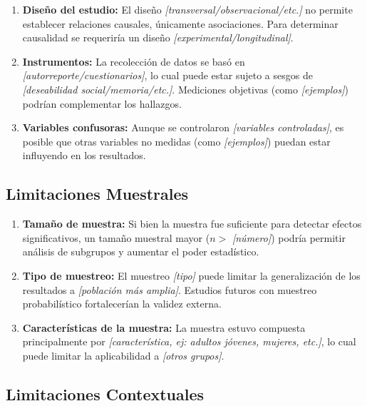 \begin{enumerate}
    \item \textbf{Diseño del estudio:} El diseño \textit{{[transversal/observacional/etc.]}} no permite establecer relaciones causales, únicamente asociaciones. Para determinar causalidad se requeriría un diseño \textit{{[experimental/longitudinal]}}.
    
    \item \textbf{Instrumentos:} La recolección de datos se basó en \textit{{[autorreporte/cuestionarios]}}, lo cual puede estar sujeto a sesgos de \textit{{[deseabilidad social/memoria/etc.]}}. Mediciones objetivas (como \textit{{[ejemplos]}}) podrían complementar los hallazgos.
    
    \item \textbf{Variables confusoras:} Aunque se controlaron \textit{{[variables controladas]}}, es posible que otras variables no medidas (como \textit{{[ejemplos]}}) puedan estar influyendo en los resultados.
\end{enumerate}

\subsection{Limitaciones Muestrales}
\label{subsec:limitaciones_muestrales}

\begin{enumerate}
    \item \textbf{Tamaño de muestra:} Si bien la muestra fue suficiente para detectar efectos significativos, un tamaño muestral mayor ($n > $ \textit{{[número]}}) podría permitir análisis de subgrupos y aumentar el poder estadístico.
    
    \item \textbf{Tipo de muestreo:} El muestreo \textit{{[tipo]}} puede limitar la generalización de los resultados a \textit{{[población más amplia]}}. Estudios futuros con muestreo probabilístico fortalecerían la validez externa.
    
    \item \textbf{Características de la muestra:} La muestra estuvo compuesta principalmente por \textit{{[característica, ej: adultos jóvenes, mujeres, etc.]}}, lo cual puede limitar la aplicabilidad a \textit{{[otros grupos]}}.
\end{enumerate}

\subsection{Limitaciones Contextuales}
\label{subsec:limitaciones_contextuales}

